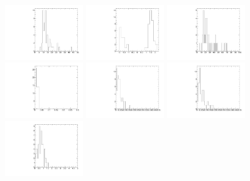 \begin{figure}
  \centering
  \includegraphics[width=0.3\textwidth]{Figures/AfterBDTCut_pt_Endcaps.pdf}
  \includegraphics[width=0.3\textwidth]{Figures/AfterBDTCut_eta_Endcaps.pdf}
  \includegraphics[width=0.3\textwidth]{Figures/AfterBDTCut_fls3d_Endcaps.pdf}
  \includegraphics[width=0.3\textwidth]{Figures/AfterBDTCut_alpha_Endcaps.pdf}
  \includegraphics[width=0.3\textwidth]{Figures/AfterBDTCut_maxdoca_Endcaps.pdf}
  \includegraphics[width=0.3\textwidth]{Figures/AfterBDTCut_pvip_Endcaps.pdf}
  \includegraphics[width=0.3\textwidth]{Figures/AfterBDTCut_pvips_Endcaps.pdf}

\end{figure}
